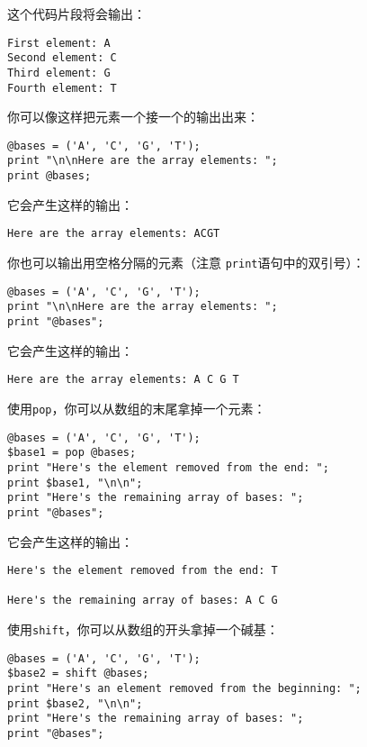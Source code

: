 这个代码片段将会输出：

\begin{lstlisting}
First element: A
Second element: C
Third element: G
Fourth element: T
\end{lstlisting}

你可以像这样把元素一个接一个的输出出来：

\begin{lstlisting}
@bases = ('A', 'C', 'G', 'T');
print "\n\nHere are the array elements: ";
print @bases;
\end{lstlisting}

它会产生这样的输出：

\begin{lstlisting}
Here are the array elements: ACGT
\end{lstlisting}

你也可以输出用空格分隔的元素（注意 \verb|print|语句中的双引号）：

\begin{lstlisting}
@bases = ('A', 'C', 'G', 'T');
print "\n\nHere are the array elements: ";
print "@bases";
\end{lstlisting}

它会产生这样的输出：

\begin{lstlisting}
Here are the array elements: A C G T
\end{lstlisting}

使用\verb|pop|，你可以从数组的末尾拿掉一个元素：

\begin{lstlisting}
@bases = ('A', 'C', 'G', 'T');
$base1 = pop @bases;
print "Here's the element removed from the end: ";
print $base1, "\n\n";
print "Here's the remaining array of bases: ";
print "@bases";
\end{lstlisting}

它会产生这样的输出：

\begin{lstlisting}
Here's the element removed from the end: T

Here's the remaining array of bases: A C G
\end{lstlisting}

使用\verb|shift|，你可以从数组的开头拿掉一个碱基：

\begin{lstlisting}
@bases = ('A', 'C', 'G', 'T');
$base2 = shift @bases;
print "Here's an element removed from the beginning: ";
print $base2, "\n\n";
print "Here's the remaining array of bases: ";
print "@bases";
\end{lstlisting}

